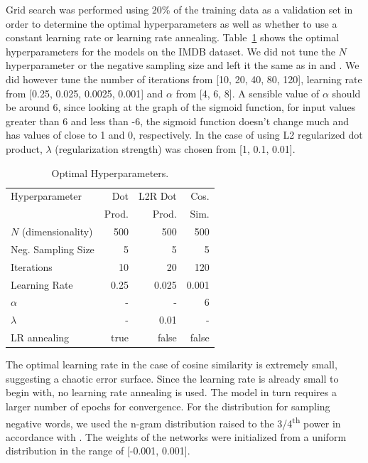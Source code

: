 \documentclass[11pt,a4paper]{article}
\begin{document}
Grid search was performed using 20\% of the training data as a validation set in order to determine the optimal hyperparameters as well as whether to use a constant learning rate or learning rate annealing. Table~\ref{oph} shows the optimal hyperparameters for the models on the IMDB dataset. We did not tune the $N$ hyperparameter or the negative sampling size and left it the same as in \cite{li2016a} and \cite{lau2016}. We did however tune the number of iterations from [10, 20, 40, 80, 120], learning rate from [0.25, 0.025, 0.0025, 0.001] and $\alpha$ from [4, 6, 8]. A sensible value of $\alpha$ should be around 6, since looking at the graph of the sigmoid function, for input values
greater than 6 and less than -6, the sigmoid function doesn't change much and has values of close to 1 and 0, respectively. In the case of using L2 regularized dot product, $\lambda$ (regularization strength) was chosen from [1, 0.1, 0.01].

\begin{table}[h]
	\centering
	\small
	\begin{tabular}{@{\hskip6pt}lrrr@{\hskip6pt}}
		\toprule
					Hyperparameter 			& Dot 	&  L2R Dot 		& Cos.  \\ 
											& Prod. & Prod.  		&Sim. 	\\
		\midrule                                                            
					$N$ (dimensionality) 	& 500	& 500 			& 500 	\\
					Neg. Sampling Size 		& 5		& 5 			& 5 	\\
					Iterations 				& 10	& 20 			& 120 	\\ 
					Learning Rate 			&  0.25	& 0.025 		& 0.001 \\
					$\alpha$ 				& - 	& - 			& 6 	\\
					$\lambda$ 				& - 	& 0.01 			&- 		\\
					LR annealing &  true& false & false \\
		\bottomrule
	\end{tabular}
	\caption{Optimal Hyperparameters.}
	\label{oph}
\end{table}

The optimal learning rate in the case of cosine similarity is extremely small, suggesting a chaotic error surface. Since the learning rate is already small to begin with, no learning rate annealing  is used. The model in turn requires a larger number of epochs for convergence. For the distribution for sampling negative words, we used the n-gram distribution raised to the 3/4\textsuperscript{th} power in accordance with \cite{mikolov2013}. The weights of the networks were initialized from a uniform distribution in the range of [-0.001, 0.001]. 
\end{document}
